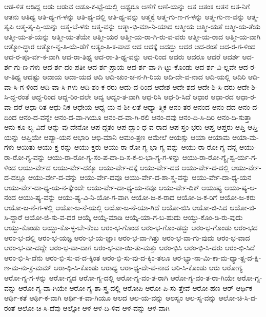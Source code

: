 {ಆಡ-ಳಿತ
ಆಡಿದ್ದ
ಆಡು
ಆಡುವ
ಆಡೂ-ಕ-ಟ್ಟೆ-ಯಲ್ಲಿ
ಆಢ್ಯರೂ
ಆಣೆಗೆ
ಆಣೆ-ಯನ್ನು
ಆತ
ಆತಂಕ
ಆತನ
ಆತ-ನಿಗೆ
ಆತನು
ಆತಿಥ್ಯ
ಆತಿ-ಥ್ಯ-ಗ-ಳನ್ನು
ಆತಿ-ಥ್ಯ-ದಲ್ಲಿ
ಆತಿ-ಥ್ಯ-ವನ್ನು
ಆತ್ಮಕ್ಕೆ
ಆತ್ಮ-ಗು-ಣ-ಗ-ಳನ್ನು
ಆತ್ಮ-ಗು-ಣ-ವನ್ನು
ಆತ್ಮ-ತೃಪಿ
ಆತ್ಮ-ತೃ-ಪ್ತಿ-ಯನ್ನು
ಆತ್ಮ-ಬೆ-ಳಕು
ಆತ್ಮ-ವನ್ನು
ಆತ್ಮಾ-ಭಿ-ಮಾ-ನಿ-ಯಾದ
ಆತ್ಮೀಯ
ಆತ್ಮೀ-ಯತೆ
ಆತ್ಮೀ-ಯ-ತೆಯ
ಆತ್ಮೀ-ಯ-ತೆ-ಯನ್ನು
ಆತ್ಮೀ-ಯ-ತೆಯೇ
ಆತ್ಮೀ-ಯರ
ಆತ್ಮೀ-ಯ-ರಾ-ಗಿ-ರು-ವ-ವರು
ಆತ್ಮೀ-ಯ-ರಾದ
ಆತ್ಮೀ-ಯ-ವಾಗಿ
ಆತ್ಮೋ-ದ್ಧಾರ
ಆತ್ಮೋ-ನ್ನ-ತಿ-ಯೆ-ಡೆಗೆ
ಆತ್ಯಂ-ತಿ-ಕ-ವಾದ
ಆದ
ಆದಕ್ಕೆ
ಆದದ್ದು
ಆದರ
ಆದ-ರಂತೆ
ಆದ-ರ-ಗ-ಳಿಂದ
ಆದ-ರ-ಪೂ-ರ್ವ-ಕ-ವಾಗಿ
ಆದ-ರಾ-ತಿಥ್ಯ
ಆದ-ರಾ-ತಿ-ಥ್ಯ-ವನ್ನು
ಆದ-ರಿಂದ
ಆದರು
ಆದರೂ
ಆದರೆ
ಆದರ್ಶ
ಆದ-ರ್ಶ-ಗು-ಣ-ಗಳು
ಆದ-ರ್ಶ-ದಂ-ಪತೀ
ಆದ-ರ್ಶ-ಪ್ರಾಯ
ಆದ-ರ್ಶ-ವಾ-ಗಿ-ಟ್ಟು-ಕೊಂಡು
ಆದ-ರ್ಶ-ವಿ-ಲ್ಲವೇ
ಆದ-ರ-ಆ-ತಿಥ್ಯ
ಆದಷ್ಟು
ಆದಾಯ
ಆದಾ-ಯದ
ಆದಿ
ಆದಿ-ಚುಂ-ಚ-ನ-ಗಿ-ರಿಯ
ಆದಿ-ದೇ-ವ-ನಾದ
ಆದಿ-ಯಲ್ಲಿ
ಆದಿರಿ
ಆದಿ-ವಾ-ಸಿ-ಗ-ಳಿಂದ
ಆದಿ-ವಾ-ಸಿ-ಗಳು
ಆದಿ-ಶಂ-ಕ-ರರು
ಆದು-ದ-ರಿಂದ
ಆದೇಶ
ಆದೇ-ಶದ
ಆದೇ-ಶಿ-ಸಿ-ದರು
ಆದೇ-ಶಿ-ಸಿ-ದ್ದ-ರಂತೆ
ಆದ್ದ-ರಿಂದ
ಆದ್ದ-ರಿಂ-ದಲೇ
ಆದ್ಯ
ಆದ್ಯಂ-ತ-ವಾಗಿ
ಆಧ-ರಿಸಿ
ಆಧ-ರಿ-ಸಿದೆ
ಆಧಾರ
ಆಧಾ-ರದ
ಆಧಾ-ರ-ವಾ-ದರೆ
ಆಧಾ-ರಿತ
ಆಧು-ನಿಕ
ಆಧೇಯ
ಆಧ್ಯ-ಯ-ನ-ಶೀ-ಲತೆ
ಆಧ್ಯಾ-ತ್ಮಿಕ
ಆನಂ-ತರ
ಆನಂದ
ಆನಂ-ದದ
ಆನಂ-ದ-ದಿಂದ
ಆನಂ-ದ-ವನ್ನೇ
ಆನಂ-ದ-ವಾ-ಗಿಯೂ
ಆನಂ-ದ-ವಾ-ಗಿ-ರಲಿ
ಆನಂ-ದವು
ಆನಂ-ದಿ-ಸಿ-ದಿರಿ
ಆನಂ-ದಿ-ಸುತ್ತಾ
ಆನು-ಕೂ-ಲ್ಯ-ವಿದೆ
ಆನ್ನು-ವು-ದೇನೋ
ಆಪ-ದ್ಗತಂ
ಆಪ-ದ್ಬಾಂ-ಧ-ವ-ರಾದ
ಆಪ-ಸ್ತಂ-ಭರು
ಆಪ್ತ
ಆಪ್ತರು
ಆಪ್ತಿ
ಆಪ್ತಿ-ಯನ್ನು
ಆಪ್ತಿಯೇ
ಆಪ್ಯಾ-ಯನ
ಆಭಾರಿ
ಆಭಿ-ಮಾನಿ
ಆಮಂ-ತ್ರಣ
ಆಮೇಲೆ
ಆಯಸ್ಸು
ಆಯಾ
ಆಯಾಮ
ಆಯಾ-ಮ-ಗಳು
ಆಯಿತು
ಆಯು-ಕ್ತ-ರನ್ನು
ಆಯು-ಕ್ತರು
ಆಯು-ರಾ-ರೋ-ಗ್ಯ-ಭಾ-ಗ್ಯ-ವನ್ನು
ಆಯು-ರಾ-ರೋ-ಗ್ಯ-ವನ್ನ
ಆಯು-ರಾ-ರೋ-ಗ್ಯ-ವನ್ನು
ಆಯು-ರಾ-ರೋ-ಗ್ಯ-ಸಂ-ಪ-ದಾ-ದಿ-ಸ-ಕ-ಲ-ಭಾ-ಗ್ಯ-ಗ-ಳನ್ನು
ಆಯು-ರಾ-ರೋ-ಗ್ಯೈ-ಶ್ವ-ರ್ಯ-ಗ-ಳಿಂದ
ಆಯು-ರ್ವೇದ
ಆಯು-ರ್ವೇ-ದಕ್ಕೂ
ಆಯು-ರ್ವೇ-ದಕ್ಕೆ
ಆಯು-ರ್ವೇ-ದದ
ಆಯು-ರ್ವೇ-ದ-ದಲ್ಲಿ
ಆಯು-ರ್ವೇ-ದ-ದಲ್ಲೂ
ಆಯು-ರ್ವೇ-ದ-ವನ್ನು
ಆಯು-ರ್ವೇ-ದವೂ
ಆಯು-ರ್ವೇ-ದ-ಶಾ-ಸ್ತ್ರ-ವನ್ನು
ಆಯು-ರ್ವೇ-ದಾ-ಧ್ಯ-ಯನ
ಆಯು-ರ್ವೇ-ದಾ-ಧ್ಯ-ಯ-ನ-ಕ್ಕೇಂದೇ
ಆಯು-ರ್ವೇ-ದಾ-ಧ್ಯ-ಯ-ನವೂ
ಆಯು-ರ್ವೇ-ದಿಕ್
ಆಯುಷ್ಯ
ಆಯು-ಷ್ಯ-ಆ-ನಂದ
ಆಯು-ಷ್ಯ-ವನ್ನು
ಆಯು-ಷ್ಯ-ವಿ-ನಿ-ಯೋ-ಗ-ವಾಗಿ
ಆಯೋ-ಜ-ಕ-ರಾದ
ಆಯೋ-ಜ-ಕ-ರಿಗೆ
ಆಯೋ-ಜ-ಕರು
ಆಯೋ-ಜ-ನೆ-ಗ-ಳಲ್ಲಿ
ಆಯೋ-ಜ-ನೆ-ಯಲ್ಲಿ
ಆಯೋ-ಜ-ನೆ-ಯಾ-ಗಿದೆ
ಆಯೋ-ಜಿಸಿ
ಆಯೋ-ಜಿ-ಸಿದ
ಆಯೋ-ಜಿ-ಸಿ-ದ್ದಾರೆ
ಆಯೋ-ಜಿ-ಸು-ವ-ದರ
ಆಯ್ಕೆ
ಆಯ್ಕೆ-ಮಾಡಿ
ಆಯ್ಕೆ-ಯಾ-ಗ-ಬ-ಹುದು
ಆಯ್ದು-ಕೊಂ-ಡಿ-ರು-ವುದು
ಆಯ್ದು-ಕೊಂಡು
ಆಯ್ದು-ಕೊ-ಳ್ಳ-ಬೇ-ಕೆಂಬ
ಆರಂ-ಭ-ಗೊಂಡ
ಆರಂ-ಭ-ಗೊಂ-ಡದ್ದು
ಆರಂ-ಭ-ಗೊಂಡು
ಆರಂ-ಭದ
ಆರಂ-ಭ-ದಲ್ಲಿ
ಆರಂ-ಭ-ಯಜ್ಞ
ಆರಂ-ಭ-ಯ-ಜ್ಞಾಃ
ಆರಂ-ಭ-ವಾ-ಗಿತ್ತು
ಆರಂ-ಭ-ವಾ-ಗು-ವುದು
ಆರಂ-ಭ-ವಾದ
ಆರಂ-ಭ-ವಾ-ದದ್ದೇ
ಆರಂ-ಭ-ವಾ-ದಾಗ
ಆರಂ-ಭ-ವಾ-ಯಿ-ತು-ಮತ್ತು
ಆರಂ-ಭಿಸಿ
ಆರಂ-ಭಿ-ಸಿ-ದರು
ಆರಂ-ಭಿ-ಸಿದೆ
ಆರಂ-ಭಿ-ಸಿ-ದೆನು
ಆರಂ-ಭಿ-ಸು-ವ-ದ-ಕ್ಕಿಂತ
ಆರಂ-ಭಿ-ಸು-ವು-ದ-ಕ್ಕಿಂ-ತಲೂ
ಆರ-ಭ್ಯಾ-ನಾ-ಮಿ-ಕಾ-ಮ-ಧ್ಯಾ-ತ್ಪ್ರ-ದ-ಕ್ಷಿ-ಣ-ಮ-ನು-ಕ್ರ-ಮಮ್
ಆರಾ-ಧಿ-ಸಿ-ಕೊಂಡು
ಆರಾಧ್ಯ
ಆರಾ-ಧ್ಯ-ದೇ-ವ-ನಾದ
ಆರಿ-ಸಿ-ಕೊಂಡು
ಆರು
ಆರೋಗ್ಯ
ಆರೋ-ಗ್ಯ-ಗ-ಳನ್ನು
ಆರೋ-ಗ್ಯದ
ಆರೋ-ಗ್ಯ-ದಲ್ಲಿ
ಆರೋ-ಗ್ಯ-ವಂ-ತ-ರಾಗಿ
ಆರೋ-ಗ್ಯ-ವಂ-ತ-ರಾ-ಗಿಯೇ
ಆರೋ-ಗ್ಯ-ವನ್ನು
ಆರೋ-ಗ್ಯ-ವಾ-ಗಿಯೇ
ಆರೋ-ಗ್ಯ-ಶಾ-ಸ್ತ್ರ-ದಲ್ಲಿ
ಆರೋಪಿ
ಆರೋ-ಪಿ-ಸು-ತ್ತೇವೆ
ಆರೋ-ಹಣ
ಆರ್
ಆರ್ಥಿಕ
ಆರ್ಥಿ-ಕತೆ
ಆರ್ಥಿ-ಕ-ವಾಗಿ
ಆರ್ಥಿ-ಕ-ವಾ-ಗಿಯೂ
ಆಲದ
ಆಲ-ಯ-ವನ್ನು
ಆಲಸ್ಯಂ
ಆಲ-ಸ್ಯ-ವನ್ನು
ಆಲೋ-ಚಿ-ಸಿ-ದ-ರಂತೆ
ಆಲೋ-ಚಿ-ಸಿ-ದೆವು
ಆಲ್ಸೋ
ಆಳ
ಆಳ-ದಿ-ಳಿವ
ಆಳ-ವನ್ನು
ಆಳ-ವಾಗಿ
}
